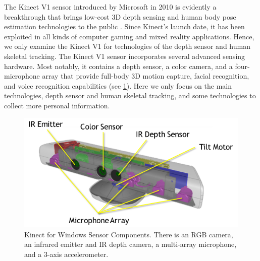 The Kinect V1 sensor introduced by Microsoft in 2010 is evidently a breakthrough that brings low-cost 3D depth sensing and human body pose estimation technologies to the public \cite{Zhang2012b}. 
Since Kinect's launch date, it has been exploited in all kinds of computer gaming and mixed reality applications. 
Hence, we only examine the Kinect V1 for technologies of the depth sensor and human skeletal tracking.
The Kinect V1 sensor incorporates several advanced sensing hardware. Most notably, it contains a depth sensor, a color camera, and a four-microphone array that provide full-body 3D motion capture, facial recognition, and voice recognition capabilities (see \figurename{\ref{fig:2-bg:kinect}}). Here we only focus on the main technologies, depth sensor and human skeletal tracking, and some technologies to collect more personal information.
\begin{figure}
	\centering
	\includegraphics[width=0.7\linewidth]{figures/2-bg/kinect}
	\caption{Kinect for Windows Sensor Components. There is an RGB camera, an infrared emitter and IR depth camera, a multi-array microphone, and a 3-axis accelerometer.}
	\label{fig:2-bg:kinect}
\end{figure}

